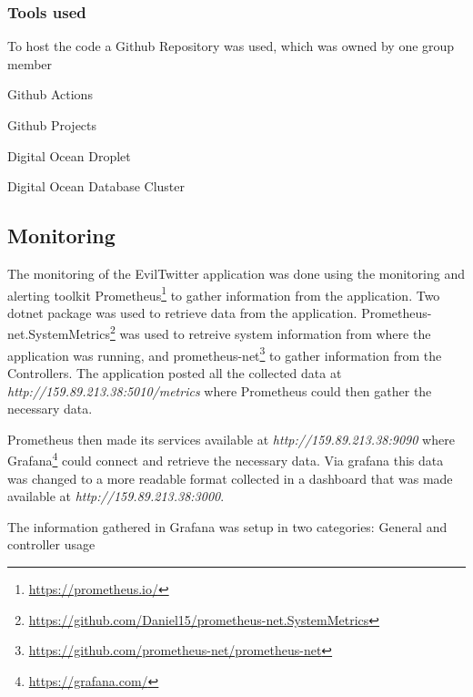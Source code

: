 \documentclass[report/main.tex]{subfiles}
\begin{document}
            \subsubsection{Tools used}

                To host the code a Github Repository was used, which was owned by one group member
        
                Github Actions
                
                Github Projects
                
                Digital Ocean Droplet
                
                Digital Ocean Database Cluster
                
            
        \subsection{Monitoring}
        \label{SubSec:monitoring}
            The monitoring of the EvilTwitter application was done using the monitoring and alerting toolkit Prometheus\footnote{\hyperlink{https://prometheus.io/}{https://prometheus.io/}} to gather information from the application. Two dotnet package was used to retrieve data from the application. Prometheus-net.SystemMetrics\footnote{\hyperlink{https://github.com/Daniel15/prometheus-net.SystemMetrics}{https://github.com/Daniel15/prometheus-net.SystemMetrics}} was used to retreive system information from where the application was running, and prometheus-net\footnote{\hyperlink{https://github.com/prometheus-net/prometheus-net}{https://github.com/prometheus-net/prometheus-net}} to gather information from the Controllers. The application posted all the collected data at \textit{http://159.89.213.38:5010/metrics} where Prometheus could then gather the necessary data.
                
            Prometheus then made its services available at \textit{http://159.89.213.38:9090} where Grafana\footnote{\hyperlink{https://grafana.com/}{https://grafana.com/}} could connect and retrieve the necessary data. Via grafana this data was changed to a more readable format collected in a dashboard that was made available at \textit{http://159.89.213.38:3000}.
            
            The information gathered in Grafana was setup in two categories: General and controller usage
                
\end{document}
